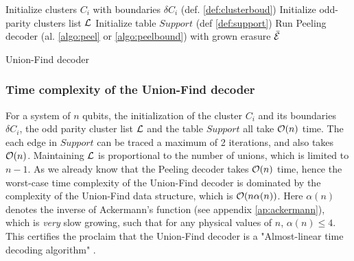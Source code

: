 \begin{algorithm}[h]
  \BlankLine
  \BlankLine
  Initialize clusters $C_i$ with boundaries $\delta C_i$ (def. \ref{def:clusterboud})\;
  Initialize odd-parity clusters list $\mathcal{L}$\;
  Initialize table $Support$ (def \ref{def:support})\;
  \BlankLine
  Run Peeling decoder (al. \ref{algo:peel} or \ref{algo:peelbound}) with grown erasure $\bar{\mathcal{E}}$
  \BlankLine
  \caption{Union-Find decoder \cite{delfosse2017almost}}\label{algo:uf}
\end{algorithm}

\subsubsection{Time complexity of the Union-Find decoder}

For a system of $n$ qubits, the initialization of the cluster $C_i$ and its boundaries $\delta C_i$, the odd parity cluster list $\mathcal{L}$ and the table $Support$ all take $\mathcal{O}(n)$ time. The each edge in $Support$ can be traced a maximum of 2 iterations, and also takes $\mathcal{O}(n)$. Maintaining $\mathcal{L}$ is proportional to the number of unions, which is limited to $n-1$. As we already know that the Peeling decoder takes $\mathcal{O}(n)$ time, hence the worst-case time complexity of the Union-Find decoder is dominated by the complexity of the Union-Find data structure, which is $\mathcal{O}(n\alpha(n))$. Here $\alpha(n)$ denotes the inverse of Ackermann's function (see appendix \ref{ap:ackermann}), which is \emph{very} slow growing, such that for any physical values of $n$, $\alpha(n) \leq 4$. This certifies the proclaim that the Union-Find decoder is a "Almost-linear time decoding algorithm" \cite{delfosse2017almost}. 



